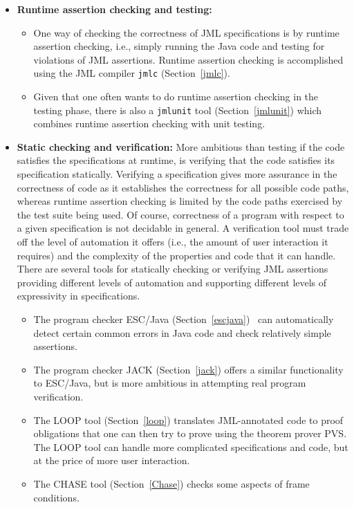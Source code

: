\documentclass{entcs}
\begin{document}
\begin{itemize}
\item {\bf Runtime assertion checking and testing:}
\begin{itemize}
\item One way of checking the correctness of JML specifications is by
  runtime assertion checking, i.e., simply running the Java code and
  testing for violations of JML assertions.  Runtime assertion
  checking is accomplished using the JML compiler {\tt jmlc}
  (Section~\ref{jmlc}).
\item Given that one often wants to do runtime assertion checking in
  the testing phase, there is also a {\tt jmlunit} tool
  (Section~\ref{jmlunit}) which combines runtime assertion checking
  with unit testing.
\end{itemize}
\item {\bf Static checking and verification:} More ambitious than
  testing if the code satisfies the specifications at runtime, is
  verifying that the code satisfies its specification statically.
  Verifying a specification gives more assurance in the correctness of
  code as it establishes the correctness for all possible code paths,
  whereas runtime assertion checking is limited by the code paths
  exercised by the test suite being used.  Of course, correctness of a
  program with respect to a given specification is not decidable in
  general.  A verification tool must trade off the level of automation
  it offers (i.e., the amount of user interaction it requires) and the
  complexity of the properties and code that it can handle.  There are
  several tools for statically checking or verifying JML assertions
  providing different levels of automation and supporting different
  levels of expressivity in specifications.
\begin{itemize}
\item The program checker ESC/Java
  (Section~\ref{escjava})~\cite{Flanagan-Et-Al02} can automatically
  detect certain common errors in Java code and check relatively
  simple assertions.
\item The program checker JACK (Section~\ref{jack}) offers a similar
  functionality to ESC/Java, but is more ambitious in attempting real
  program verification.
\item The LOOP tool (Section~\ref{loop}) translates JML-annotated code
  to proof obligations that one can then try to prove using the
  theorem prover PVS\@.  The LOOP tool can handle more complicated
  specifications and code, but at the price of more user interaction.
\item The CHASE tool (Section~\ref{Chase}) checks some aspects of
  frame conditions.
\end{itemize}


\end{itemize}
\end{document}

